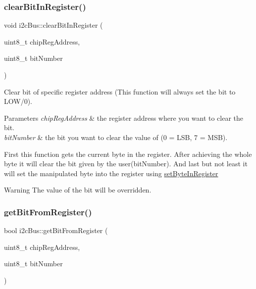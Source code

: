 \subsubsection{\texorpdfstring{clear\+Bit\+In\+Register()}{clearBitInRegister()}}
{\footnotesize\ttfamily void i2c\+Bus\+::clear\+Bit\+In\+Register (\begin{DoxyParamCaption}\item[{uint8\+\_\+t}]{chip\+Reg\+Address,  }\item[{uint8\+\_\+t}]{bit\+Number }\end{DoxyParamCaption})}



Clear bit of specific register address (This function will always set the bit to L\+O\+W/0). 


\begin{DoxyParams}{Parameters}
{\em chip\+Reg\+Address} & the register address where you want to clear the bit. \\
\hline
{\em bit\+Number} & the bit you want to clear the value of (0 = L\+SB, 7 = M\+SB).\\
\hline
\end{DoxyParams}
First this function gets the current byte in the register. After achieving the whole byte it will clear the bit given by the user(bit\+Number). And last but not least it will set the manipulated byte into the register using \mbox{\hyperlink{classi2c_bus_a8bed9bf37dee74b691ab4c92723dd206}{set\+Byte\+In\+Register}} \begin{DoxyWarning}{Warning}
The value of the bit will be overridden. 
\end{DoxyWarning}
\mbox{\label{classi2c_bus_aeedd7fa6ab6640fe86bcfb8a3ac3f306}} 
\subsubsection{\texorpdfstring{get\+Bit\+From\+Register()}{getBitFromRegister()}}
{\footnotesize\ttfamily bool i2c\+Bus\+::get\+Bit\+From\+Register (\begin{DoxyParamCaption}\item[{uint8\+\_\+t}]{chip\+Reg\+Address,  }\item[{uint8\+\_\+t}]{bit\+Number }\end{DoxyParamCaption})}




